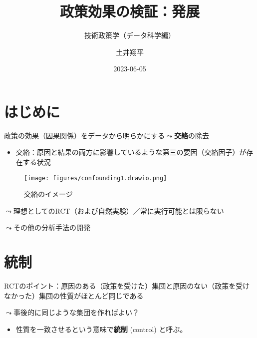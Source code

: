 \documentclass[
  xelatex,
  ja=standard]{bxjsarticle}
\title{政策効果の検証：発展}
\subtitle{技術政策学（データ科学編）}
\author{土井翔平}
\date{2023-06-05}
\providecommand{\tightlist}{%
  \setlength{\itemsep}{0pt}\setlength{\parskip}{0pt}}\usepackage{longtable,booktabs,array}
\begin{document}
\maketitle
\ifdefined\Shaded\renewenvironment{Shaded}{\begin{tcolorbox}[interior hidden, sharp corners, boxrule=0pt, frame hidden, breakable, enhanced, borderline west={3pt}{0pt}{shadecolor}]}{\end{tcolorbox}}\fi

\hypertarget{ux306fux3058ux3081ux306b}{%
\section*{はじめに}\label{ux306fux3058ux3081ux306b}}

政策の効果（因果関係）をデータから明らかにする\(\leadsto\)\textbf{交絡}の除去

\begin{itemize}
\tightlist
\item
  交絡：原因と結果の両方に影響しているような第三の要因（交絡因子）が存在する状況
\end{itemize}

\begin{figure}[htpb]

{\centering \texttt{[image: figures/confounding1.drawio.png]}

}

\caption{交絡のイメージ}

\end{figure}

\(\leadsto\)理想としてのRCT（および自然実験）／常に実行可能とは限らない

\(\leadsto\)その他の分析手法の開発

\hypertarget{ux7d71ux5236}{%
\section{統制}\label{ux7d71ux5236}}

RCTのポイント：原因のある（政策を受けた）集団と原因のない（政策を受けなかった）集団の性質がほとんど同じである

\(\leadsto\)事後的に同じような集団を作ればよい？

\begin{itemize}
\tightlist
\item
  性質を一致させるという意味で\textbf{統制} (control) と呼ぶ。
\end{itemize}
\end{document}
